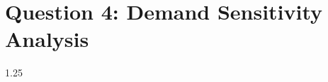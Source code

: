 \section{Question 4: Demand Sensitivity Analysis}
\label{sec:chap_4}

\begin{spacing}{1.25}


    
\end{spacing}